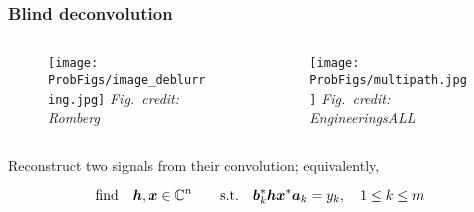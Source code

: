 \documentclass[compress,
mathserif,wide,%
]{beamer}
\newcommand{\ProbFigs}{figure}
\begin{document}
\begin{comment}
\begin{frame}
	\frametitle{Byproduct: entrywise error}
	\begin{theorem}[Matrix completion entrywise error]
Suppose $\bm{M}^\natural$ is $\mu$-incoherent, \alert{plain gradient descent} achieves
\begin{itemize}
	\item exponential decay in entrywise error
\end{itemize}
provided that $\eta \lesssim \frac{1}{\sigma_{\max}}$ and
$ \text{sample size}~ n^2 p \gtrsim \mu^3 r^3 n\log^3 n $.
\end{theorem}
Implication: 
\begin{align*}
	\left\Vert \bm{X}^{t}\bm{X}^{t\top}-\bm{M}^{\natural}\right\Vert _{\infty}\lesssim\left(\rho^{t}\mu r\sqrt{\frac{\log n}{np}}+\frac{\sigma}{\sigma_{\min}}\sqrt{\frac{n\log n}{p}}\right)\left\Vert \bm{M}^{\natural}\right\Vert _{\infty}
\end{align*}
\end{frame}
\end{comment}



\begin{frame}
	\frametitle{Blind deconvolution}
	\begin{columns}

\begin{column}{0.6\textwidth}
\begin{figure}
	{\texttt{[image: \\ProbFigs/image\_deblurring.jpg]}}
	\hfill {\footnotesize\em Fig.~credit:  Romberg~~}
\end{figure}
\end{column}

\begin{column}{0.35\textwidth}
\begin{figure}
	{\texttt{[image: \\ProbFigs/multipath.jpg]}}
	\hfill {\footnotesize\em Fig.~credit:  EngineeringsALL~~}
\end{figure}
\end{column}
\end{columns}
\vfill

Reconstruct two signals from their convolution; equivalently,

\[
\text{find}\text{\quad}\bm{h},\bm{x}\in\mathbb{C}^{n}\qquad\text{s.t.}\quad\bm{b}_{k}^{*}\bm{h}\bm{x}^{*}\bm{a}_{k}= y_k,\quad1\leq k\leq m
\]

\end{frame}
\end{document}
